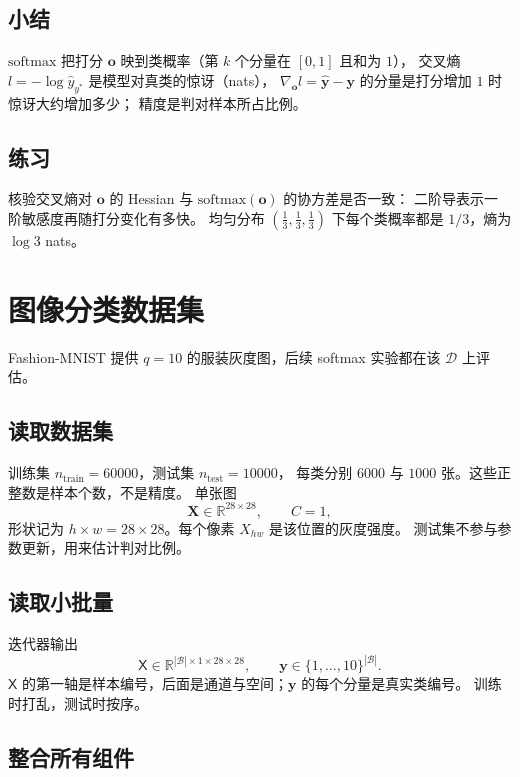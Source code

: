 \subsection{小结}

$\mathrm{softmax}$ 把打分 $\bm{o}$ 映到类概率（第 $k$ 个分量在 $[0,1]$ 且和为 $1$），
交叉熵 $l=-\log\hat{y}_{y^{\ast}}$ 是模型对真类的惊讶（nats），
$\nabla_{\bm{o}}l=\hat{\bm{y}}-\bm{y}$ 的分量是打分增加 $1$ 时惊讶大约增加多少；
精度是判对样本所占比例。

\subsection{练习}

核验交叉熵对 $\bm{o}$ 的 Hessian 与 $\mathrm{softmax}(\bm{o})$ 的协方差是否一致：
二阶导表示一阶敏感度再随打分变化有多快。
均匀分布 $(\tfrac{1}{3},\tfrac{1}{3},\tfrac{1}{3})$ 下每个类概率都是 $1/3$，熵为 $\log 3$ nats。

\section{图像分类数据集}

Fashion-MNIST 提供 $q=10$ 的服装灰度图，后续 softmax 实验都在该 $\mathcal{D}$ 上评估。

\subsection{读取数据集}

训练集 $n_{\mathrm{train}}=60000$，测试集 $n_{\mathrm{test}}=10000$，
每类分别 $6000$ 与 $1000$ 张。这些正整数是样本个数，不是精度。
单张图
\[
\bm{X}\in\mathbb{R}^{28\times 28},\qquad C=1,
\]
形状记为 $h\times w=28\times 28$。每个像素 $X_{hw}$ 是该位置的灰度强度。
测试集不参与参数更新，用来估计判对比例。

\subsection{读取小批量}

迭代器输出
\[
\mathsf{X}\in\mathbb{R}^{|\mathcal{B}|\times 1\times 28\times 28},\qquad
\bm{y}\in\{1,\ldots,10\}^{|\mathcal{B}|}.
\]
$\mathsf{X}$ 的第一轴是样本编号，后面是通道与空间；$\bm{y}$ 的每个分量是真实类编号。
训练时打乱，测试时按序。

\subsection{整合所有组件}

